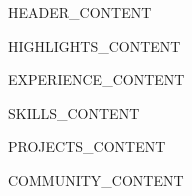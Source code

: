 \documentclass[11pt,letterpaper]{article}
\begin{document}
{{HEADER_CONTENT}}

\vspace{0.4em}
\noindent
{{HIGHLIGHTS_CONTENT}}
\vspace{0.8em}

{{EXPERIENCE_CONTENT}}

{{SKILLS_CONTENT}}

{{PROJECTS_CONTENT}}

{{COMMUNITY_CONTENT}}
\end{document}
